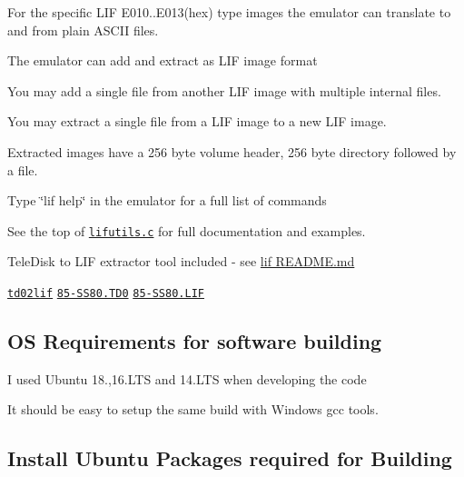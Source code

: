 \begin{DoxyItemize}
\begin{DoxyItemize}
\begin{DoxyItemize}
\item For the specific L\+IF E010..E013(hex) type images the emulator can translate to and from plain A\+S\+C\+II files.
\item The emulator can add and extract as L\+IF image format
\begin{DoxyItemize}
\item You may add a single file from another L\+IF image with multiple internal files.
\item You may extract a single file from a L\+IF image to a new L\+IF image.
\item Extracted images have a 256 byte volume header, 256 byte directory followed by a file.
\end{DoxyItemize}
\item Type \char`\"{}lif help\char`\"{} in the emulator for a full list of commands
\begin{DoxyItemize}
\item See the top of \href{lif/lifutils.c}{\tt lifutils.\+c} for full documentation and examples.
\end{DoxyItemize}
\item Tele\+Disk to L\+IF extractor tool included -\/ see \hyperlink{md_lif_README}{lif R\+E\+A\+D\+ME.md}
\begin{DoxyItemize}
\item \href{lif/t202lif}{\tt td02lif} \href{lif/85-SS80.TD0}{\tt 85-\/\+S\+S80.\+T\+D0} \href{lif/85-SS80.LIF}{\tt 85-\/\+S\+S80.\+L\+IF} 

 \subsection*{OS Requirements for software building}
\end{DoxyItemize}
\end{DoxyItemize}
\end{DoxyItemize}
\end{DoxyItemize}

I used Ubuntu 18.,16.\+L\+TS and 14.\+L\+TS when developing the code
\begin{DoxyItemize}
\item It should be easy to setup the same build with Windows gcc tools.
\end{DoxyItemize}

\subsection*{Install Ubuntu Packages required for Building}



